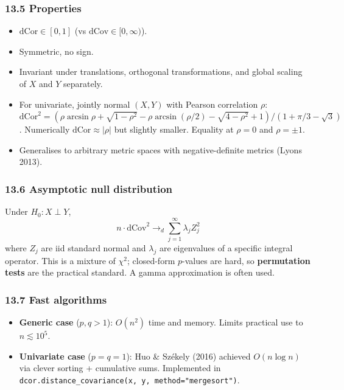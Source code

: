 \documentclass{article}
\providecommand{\tightlist}{\setlength{\itemsep}{0pt}\setlength{\parskip}{0pt}}
\begin{document}
\subsubsection{13.5 Properties}\label{135-properties}

\begin{itemize}
\tightlist
\item
  \(\mathrm{dCor} \in [0, 1]\) (vs \(\mathrm{dCov} \in [0, \infty)\)).
\item
  Symmetric, no sign.
\item
  Invariant under translations, orthogonal transformations, and global
  scaling of \(X\) and \(Y\) separately.
\item
  For univariate, jointly normal \((X, Y)\) with Pearson correlation
  \(\rho\):
  \(\mathrm{dCor}^2 = (\rho \arcsin\rho + \sqrt{1 - \rho^2} - \rho \arcsin(\rho/2) - \sqrt{4 - \rho^2} + 1)/(1 + \pi/3 - \sqrt{3})\).
  Numerically \(\mathrm{dCor} \approx |\rho|\) but slightly smaller.
  Equality at \(\rho = 0\) and \(\rho = \pm 1\).
\item
  Generalises to arbitrary metric spaces with negative-definite metrics
  (Lyons 2013).
\end{itemize}

\subsubsection{13.6 Asymptotic null
distribution}\label{136-asymptotic-null-distribution}

Under \(H_0: X \perp Y\), \[
n \cdot \mathrm{dCov}^2 \to_d \sum_{j=1}^{\infty} \lambda_j Z_j^2
\] where \(Z_j\) are iid standard normal and \(\lambda_j\) are
eigenvalues of a specific integral operator. This is a mixture of
\(\chi^2\); closed-form \(p\)-values are hard, so \textbf{permutation
tests} are the practical standard. A gamma approximation is often used.

\subsubsection{13.7 Fast algorithms}\label{137-fast-algorithms}

\begin{itemize}
\tightlist
\item
  \textbf{Generic case} (\(p, q > 1\)): \(O(n^2)\) time and memory.
  Limits practical use to \(n \lesssim 10^5\).
\item
  \textbf{Univariate case} (\(p = q = 1\)): Huo \& Székely (2016)
  achieved \(O(n \log n)\) via clever sorting + cumulative sums.
  Implemented in
  \texttt{dcor.distance\_covariance(x,\ y,\ method="mergesort")}.
\end{itemize}
\end{document}
